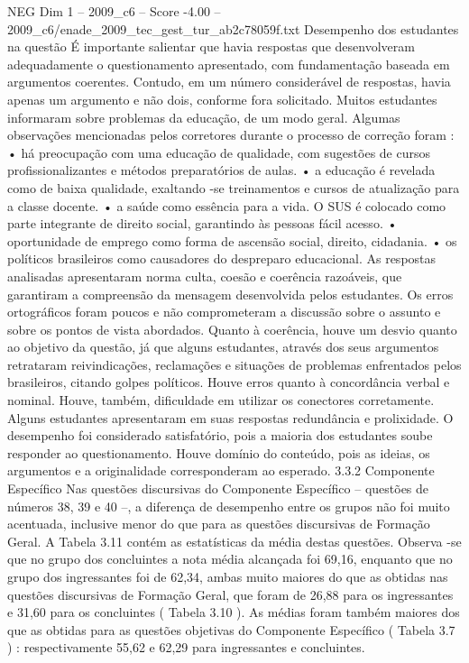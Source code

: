\begin{textsample}{NEG Dim 1 – 2009\_c6 – Score -4.00 – 2009\_c6/enade\_2009\_tec\_gest\_tur\_ab2c78059f.txt}
Desempenho dos estudantes na questão É importante salientar que havia respostas que desenvolveram adequadamente o questionamento apresentado, com fundamentação baseada em argumentos coerentes.
Contudo, em um número considerável de respostas, havia apenas um argumento e não dois, conforme fora solicitado.
Muitos estudantes informaram sobre problemas da educação, de um modo geral.
Algumas observações mencionadas pelos corretores durante o processo de correção foram : • há preocupação com uma educação de qualidade, com sugestões de cursos profissionalizantes e métodos preparatórios de aulas. • a educação é revelada como de baixa qualidade, exaltando -se treinamentos e cursos de atualização para a classe docente. • a saúde como essência para a vida.
O SUS é colocado como parte integrante de direito social, garantindo às pessoas fácil acesso. • oportunidade de emprego como forma de ascensão social, direito, cidadania. • os políticos brasileiros como causadores do despreparo educacional.
As respostas analisadas apresentaram norma culta, coesão e coerência razoáveis, que garantiram a compreensão da mensagem desenvolvida pelos estudantes.
Os erros ortográficos foram poucos e não comprometeram a discussão sobre o assunto e sobre os pontos de vista abordados.
Quanto à coerência, houve um desvio quanto ao objetivo da questão, já que alguns estudantes, através dos seus argumentos retrataram reivindicações, reclamações e situações de problemas enfrentados pelos brasileiros, citando golpes políticos.
Houve erros quanto à concordância verbal e nominal.
Houve, também, dificuldade em utilizar os conectores corretamente.
Alguns estudantes apresentaram em suas respostas redundância e prolixidade.
O desempenho foi considerado satisfatório, pois a maioria dos estudantes soube responder ao questionamento.
Houve domínio do conteúdo, pois as ideias, os argumentos e a originalidade corresponderam ao esperado. 3.3.2 Componente Específico Nas questões discursivas do Componente Específico – questões de números 38, 39 e 40 –, a diferença de desempenho entre os grupos não foi muito acentuada, inclusive menor do que para as questões discursivas de Formação Geral.
A Tabela 3.11 contém as estatísticas da média destas questões.
Observa -se que no grupo dos concluintes a nota média alcançada foi 69,16, enquanto que no grupo dos ingressantes foi de 62,34, ambas muito maiores do que as obtidas nas questões discursivas de Formação Geral, que foram de 26,88 para os ingressantes e 31,60 para os concluintes ( Tabela 3.10 ).
As médias foram também maiores dos que as obtidas para as questões objetivas do Componente Específico ( Tabela 3.7 ) : respectivamente 55,62 e 62,29 para ingressantes e concluintes.

\end{textsample}
